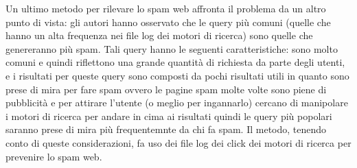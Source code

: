 Un ultimo metodo \cite{Wei:2012:FAW:2348283.2348338} per rilevare lo spam web affronta  il problema da un altro punto di vista: gli autori hanno osservato che le query più comuni (quelle che hanno un alta frequenza nei file log dei motori di ricerca) sono  quelle che genereranno più spam. Tali query hanno le seguenti caratteristiche: sono molto comuni e quindi riflettono una grande quantità di richiesta da parte degli utenti, e i risultati per queste query sono composti da pochi risultati utili in quanto sono prese di mira per fare spam ovvero le pagine spam molte volte sono piene di pubblicità e per attirare l'utente (o meglio per ingannarlo) cercano di manipolare i motori di ricerca per andare in cima ai risultati quindi le query più popolari saranno prese di mira più frequentemnte da chi fa spam. Il metodo, tenendo conto di queste considerazioni, fa uso dei file log dei click dei motori di ricerca per prevenire lo spam web.
